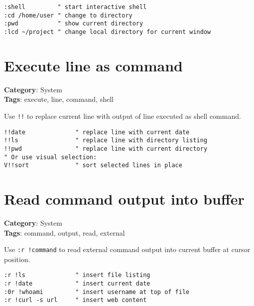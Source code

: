 {{{{{{{{{{{{{\begin{Exa*}{}
\begin{Verbatim}[fontsize=\footnotesize, breaklines, breakanywhere]
:shell         " start interactive shell
:cd /home/user " change to directory
:pwd           " show current directory
:lcd ~/project " change local directory for current window
\end{Verbatim}
\end{Exa*}

\section{Execute line as command}

\textbf{Category}: System\\ \textbf{Tags}: execute, line, command, shell
\vspace{0.5cm}

Use {\footnotesize \Verb§!!§} to replace current line with output of line executed as shell command.

\begin{Exa*}{}
\begin{Verbatim}[fontsize=\footnotesize, breaklines, breakanywhere]
!!date              " replace line with current date
!!ls                " replace line with directory listing
!!pwd               " replace line with current directory
" Or use visual selection:
V!!sort             " sort selected lines in place
\end{Verbatim}
\end{Exa*}

\section{Read command output into buffer}

\textbf{Category}: System\\ \textbf{Tags}: command, output, read, external
\vspace{0.5cm}

Use {\footnotesize \Verb§:r !command§} to read external command output into current buffer at cursor position.

\begin{Exa*}{}
\begin{Verbatim}[fontsize=\footnotesize, breaklines, breakanywhere]
:r !ls              " insert file listing
:r !date            " insert current date
:0r !whoami         " insert username at top of file
:r !curl -s url     " insert web content
\end{Verbatim}
\end{Exa*}

}}}}}}}}}}}}}
